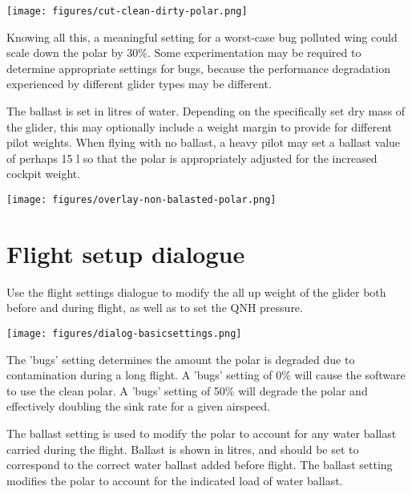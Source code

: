 \begin{center}
\texttt{[image: figures/cut-clean-dirty-polar.png]}
\end{center}
Knowing all this, a meaningful setting for a worst-case bug polluted wing could
scale down the polar by 30\%. Some experimentation may be required to determine 
appropriate settings for bugs, because the performance degradation experienced 
by different glider types may be different.

The ballast is set in litres of water. 
Depending on the specifically set dry mass of the glider, this may optionally 
include a weight margin to provide for different pilot weights.
  When flying with no ballast, a heavy pilot
may set a ballast value of perhaps 15 l so that the polar is
appropriately adjusted for the increased cockpit weight.

\begin{center}
\texttt{[image: figures/overlay-non-balasted-polar.png]}
\end{center}


\section{Flight setup dialogue}\label{sec:flight-setup}
Use the flight settings dialogue to modify the all up weight of the glider both
before and during flight, as well as to set the QNH pressure.  

\begin{center}
\texttt{[image: figures/dialog-basicsettings.png]}
\end{center}

The 'bugs' setting determines the amount the polar is degraded
due to contamination during a long flight.  A 'bugs' setting of 0\%
will cause the software to use the clean polar. A 'bugs' setting of
50\% will degrade the polar and effectively doubling the sink
rate for a given airspeed.

The ballast setting is used to modify the polar to account for any
water ballast carried during the flight. Ballast is shown in litres,
and should be set to correspond to the correct water ballast added
before flight.  The ballast setting modifies the polar to account for
the indicated load of water ballast.


